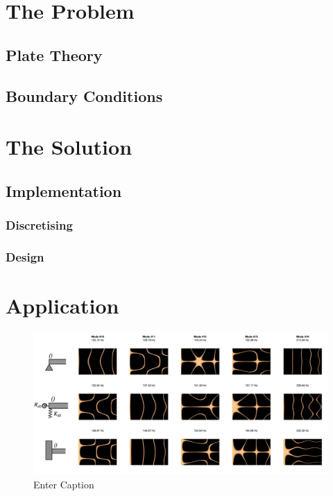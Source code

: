 \section{The Problem}\label{the-problem-2}

\subsection{Plate Theory}\label{plate-theory}

\subsection{Boundary Conditions}\label{boundary-conditions}

\section{The Solution}\label{the-solution-1}

\subsection{Implementation}\label{implementation}

\subsubsection{Discretising}\label{discretising}
\subsubsection{Design}\label{design}

\section{Application}\label{application-1}

\begin{figure}
    \centering
    \includegraphics[width=1\linewidth]{img/boundary-types.png}
    \caption{Enter Caption}
    \label{fig:boundary-types}
\end{figure}


